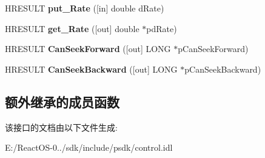 \begin{DoxyCompactItemize}
\item 
\mbox{\label{interface_quartz_type_lib_1_1_i_media_position_a530d6cc8dd8b8495a4f0972b3d89097f}} 
H\+R\+E\+S\+U\+LT {\bfseries put\+\_\+\+Rate} (\mbox{[}in\mbox{]} double d\+Rate)
\item 
\mbox{\label{interface_quartz_type_lib_1_1_i_media_position_a38a0c26c9a85aa598e91e2f1a25c3ee4}} 
H\+R\+E\+S\+U\+LT {\bfseries get\+\_\+\+Rate} (\mbox{[}out\mbox{]} double $\ast$pd\+Rate)
\item 
\mbox{\label{interface_quartz_type_lib_1_1_i_media_position_a472bae39a5ac93459b0f9b42c9aba59b}} 
H\+R\+E\+S\+U\+LT {\bfseries Can\+Seek\+Forward} (\mbox{[}out\mbox{]} L\+O\+NG $\ast$p\+Can\+Seek\+Forward)
\item 
\mbox{\label{interface_quartz_type_lib_1_1_i_media_position_a2be696f26946a161df9e034fd4e5d822}} 
H\+R\+E\+S\+U\+LT {\bfseries Can\+Seek\+Backward} (\mbox{[}out\mbox{]} L\+O\+NG $\ast$p\+Can\+Seek\+Backward)
\end{DoxyCompactItemize}
\subsection*{额外继承的成员函数}


该接口的文档由以下文件生成\+:\begin{DoxyCompactItemize}
\item 
E\+:/\+React\+O\+S-\/0../sdk/include/psdk/control.\+idl\end{DoxyCompactItemize}
